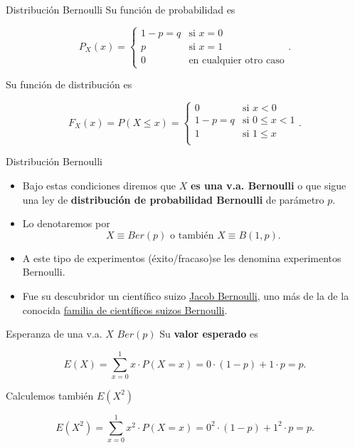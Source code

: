 \documentclass[
  ignorenonframetext,
  aspectratio=169]{beamer}
\providecommand{\tightlist}{%
  \setlength{\itemsep}{0pt}\setlength{\parskip}{0pt}}\usepackage{longtable,booktabs,array}
\begin{document}
\begin{frame}{Distribución Bernoulli}
\protect\hypertarget{distribuciuxf3n-bernoulli-2}{}
Su función de probabilidad es

\[
P_{X}(x)=
\left\{
\begin{array}{ll} 1-p=q & \mbox{si } x=0\\
p & \mbox{si } x=1\\
0 & \mbox{en cualquier otro caso}
\end{array}
\right..
\]

Su función de distribución es

\[
F_{X}(x)=P(X\leq x)=
\left\{
\begin{array}{ll} 
0 & \mbox{si } x<0\\
1-p=q & \mbox{si } 0\leq x <1\\
1 & \mbox{si } 1\leq x \\
\end{array}
\right..
\]
\end{frame}

\begin{frame}{Distribución Bernoulli}
\protect\hypertarget{distribuciuxf3n-bernoulli-3}{}
\begin{itemize}
\tightlist
\item
  Bajo estas condiciones diremos que \(X\) \textbf{es una v.a.
  Bernoulli} o que sigue una ley de \textbf{distribución de probabilidad
  Bernoulli} de parámetro \(p\).
\item
  Lo denotaremos por
  \[X\equiv Ber(p)\mbox{ o también } X\equiv B(1,p).\]
\item
  A este tipo de experimentos (éxito/fracaso)se les denomina
  experimentos Bernoulli.
\item
  Fue su descubridor un científico suizo
  \href{https://es.wikipedia.org/wiki/Jakob_Bernoulli}{Jacob Bernoulli},
  uno más de la de la conocida
  \href{https://es.wikipedia.org/wiki/Familia_Bernoulli}{familia de
  científicos suizos Bernoulli}.
\end{itemize}
\end{frame}

\begin{frame}{Esperanza de una v.a. \(X\) \(Ber(p)\)}
\protect\hypertarget{esperanza-de-una-v.a.-x-berp}{}
Su \textbf{valor esperado} es

\[E(X)=\displaystyle\sum_{x=0}^1 x\cdot P(X=x)= 0\cdot(1-p)+1\cdot p=p.\]

Calculemos también \(E(X^2)\)

\[E(X^2)=\displaystyle\sum_{x=0}^1 x^2\cdot P(X=x)= 0^2\cdot(1-p)+1^2\cdot p=p.\]
\end{frame}
\end{document}
